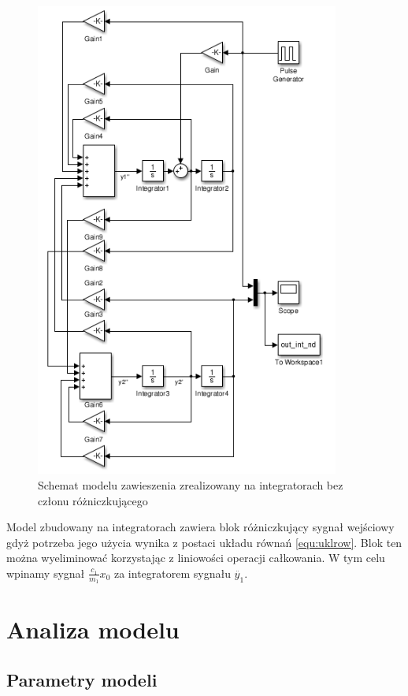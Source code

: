 \documentclass[12pt]{article}
\begin{document}
\begin{figure}[!htb]
	\begin{center}
		\includegraphics[width=10cm]{../res/img/integ_nd.png}
	\end{center}
	\caption{Schemat modelu zawieszenia zrealizowany na integratorach bez członu
	różniczkującego}
	\label{rys:schnd}
\end{figure}

Model zbudowany na integratorach zawiera blok różniczkujący sygnał wejściowy
gdyż potrzeba jego użycia wynika z postaci układu równań \eqref{equ:uklrow}.
Blok ten można wyeliminować korzystając z liniowości operacji całkowania. W tym celu
wpinamy sygnał $\frac{c_1}{m_1}x_0$ za integratorem sygnału $\ddot{y_1}$.

\newpage

\section{Analiza modelu}

\subsection{Parametry modeli}
\end{document}
